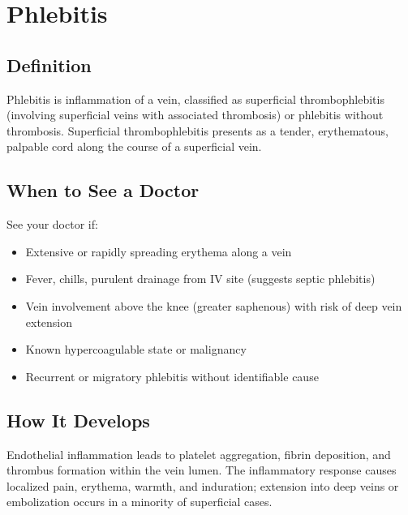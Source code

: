 \chapter{Phlebitis}

\section*{Definition}
Phlebitis is inflammation of a vein, classified as superficial thrombophlebitis (involving superficial veins with associated thrombosis) or phlebitis without thrombosis. Superficial thrombophlebitis presents as a tender, erythematous, palpable cord along the course of a superficial vein.

\section*{When to See a Doctor}
See your doctor if:
\begin{itemize}
  \item Extensive or rapidly spreading erythema along a vein
  \item Fever, chills, purulent drainage from IV site (suggests septic phlebitis)
  \item Vein involvement above the knee (greater saphenous) with risk of deep vein extension
  \item Known hypercoagulable state or malignancy
  \item Recurrent or migratory phlebitis without identifiable cause
\end{itemize}

\section*{How It Develops}
Endothelial inflammation leads to platelet aggregation, fibrin deposition, and thrombus formation within the vein lumen. The inflammatory response causes localized pain, erythema, warmth, and induration; extension into deep veins or embolization occurs in a minority of superficial cases.


